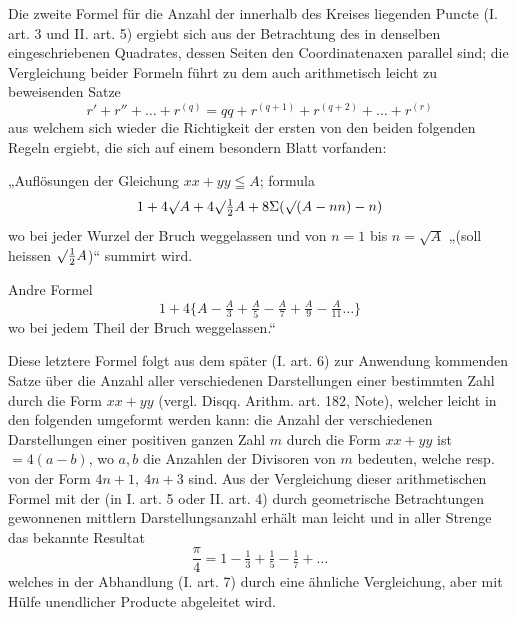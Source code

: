 Die zweite Formel für die Anzahl der innerhalb des Kreises liegenden Puncte (I. art. 3 und II. art. 5) ergiebt sich aus der Betrachtung des in denselben eingeschriebenen Quadrates, dessen Seiten den Coordinatenaxen parallel sind; die Vergleichung beider Formeln führt zu dem auch arithmetisch leicht zu beweisenden Satze
\[
r'+r''+\ldots+r^{(q)}=qq+r^{(q+1)}+r^{(q+2)}+\ldots+r^{(r)}
\]
aus welchem sich wieder die Richtigkeit der ersten von den beiden folgenden Regeln ergiebt, die sich auf einem besondern Blatt vorfanden:

„Auflösungen der Gleichung $xx+yy\leqq A$; formula
\[
1+4\surd A+4\surd\tfrac12 A+8\Sigma(\surd(A-nn)-n)
\]
wo bei jeder Wurzel der Bruch weggelassen und von $n=1$ bis $n=\surd A$ „(soll heissen $\surd\tfrac12 A$)“ summirt wird.

Andre Formel
\[
1+4\{A-\tfrac A3+\tfrac A5-\tfrac A7+\tfrac A9-\tfrac A{11}\ldots\}
\]
wo bei jedem Theil der Bruch weggelassen.“

Diese letztere Formel folgt aus dem später (I. art. 6) zur Anwendung kommenden Satze über die Anzahl aller verschiedenen Darstellungen einer bestimmten Zahl durch die Form $xx+yy$ (vergl. Disqq. Arithm. art. 182, Note), welcher leicht in den folgenden umgeformt werden kann: die Anzahl der verschiedenen Darstellungen einer positiven ganzen Zahl $m$ durch die Form $xx+yy$ ist $=4(a-b)$, wo $a,b$ die Anzahlen der Divisoren von $m$ bedeuten, welche resp. von der Form $4n+1,\ 4n+3$ sind. Aus der Vergleichung
%
dieser arithmetischen Formel mit der (in I. art. 5 oder II. art. 4) durch geometrische Betrachtungen gewonnenen mittlern Darstellungsanzahl erhält man leicht und in aller Strenge das bekannte Resultat
\[
\frac\pi4=1-\tfrac13+\tfrac15-\tfrac17+\ldots
\]
welches in der Abhandlung (I. art. 7) durch eine ähnliche Vergleichung, aber mit Hülfe unendlicher Producte abgeleitet wird.

